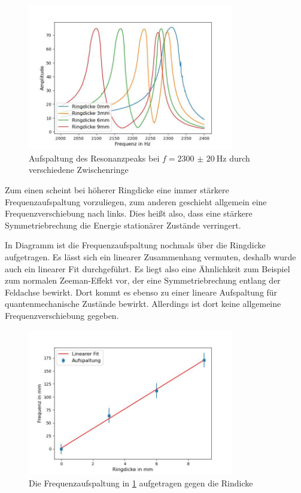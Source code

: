 \documentclass[../main.tex]{subfiles}
\begin{document}
        \begin{figure}[H]
            \centering
            \includegraphics[width=0.8\textwidth]{Bilddateien/Auswertung/III_n_Ringdickenspektrum.jpg}
            \caption{Aufspaltung des Resonanzpeaks bei $f=\SI{2300(20)}{\hertz}$ durch verschiedene Zwischenringe}
            \label{fig:III_n_Ringdickenspektrum}
        \end{figure}

        Zum einen scheint bei höherer Ringdicke eine immer stärkere Frequenzaufspaltung vorzuliegen, zum anderen geschieht allgemein eine Frequenzverschiebung nach links. Dies heißt also, dass eine stärkere Symmetriebrechung die Energie stationärer Zustände verringert. 
        
        In Diagramm ist die Frequenzaufspaltung nochmals 
        über die Ringdicke aufgetragen. Es lässt sich ein linearer Zusammenhang vermuten, deshalb wurde auch ein linearer Fit durchgeführt. Es liegt also eine Ähnlichkeit zum Beispiel zum normalen Zeeman-Effekt vor, der eine Symmetriebrechung entlang der Feldachse bewirkt. Dort kommt es ebenso zu einer lineare Aufspaltung für quantenmechanische Zustände bewirkt. Allerdings ist dort keine allgemeine Frequenzverschiebung gegeben.

        \begin{figure}[H]
            \centering
            \includegraphics[width=0.8\textwidth]{Bilddateien/Auswertung/III_n_Frequenzaufspaltung.jpg}
            \caption{Die Frequenzaufspaltung in \ref{fig:III_n_Ringdickenspektrum} aufgetragen gegen die Rindicke}
            \label{fig:III_n_Frequenzaufspaltung}
        \end{figure}
\end{document}
